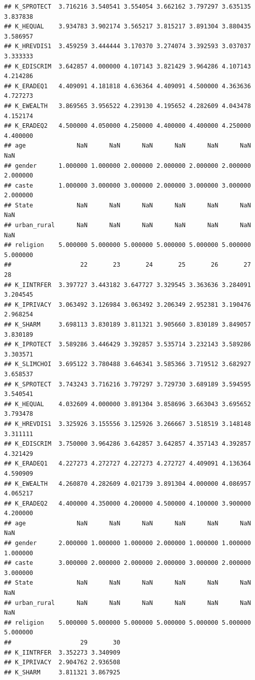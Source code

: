 \documentclass[
]{article}
\begin{document}
\begin{verbatim}
## K_SPROTECT  3.716216 3.540541 3.554054 3.662162 3.797297 3.635135 3.837838
## K_HEQUAL    3.934783 3.902174 3.565217 3.815217 3.891304 3.880435 3.586957
## K_HREVDIS1  3.459259 3.444444 3.170370 3.274074 3.392593 3.037037 3.333333
## K_EDISCRIM  3.642857 4.000000 4.107143 3.821429 3.964286 4.107143 4.214286
## K_ERADEQ1   4.409091 4.181818 4.636364 4.409091 4.500000 4.363636 4.727273
## K_EWEALTH   3.869565 3.956522 4.239130 4.195652 4.282609 4.043478 4.152174
## K_ERADEQ2   4.500000 4.050000 4.250000 4.400000 4.400000 4.250000 4.400000
## age              NaN      NaN      NaN      NaN      NaN      NaN      NaN
## gender      1.000000 1.000000 2.000000 2.000000 2.000000 2.000000 2.000000
## caste       1.000000 3.000000 3.000000 2.000000 3.000000 3.000000 2.000000
## State            NaN      NaN      NaN      NaN      NaN      NaN      NaN
## urban_rural      NaN      NaN      NaN      NaN      NaN      NaN      NaN
## religion    5.000000 5.000000 5.000000 5.000000 5.000000 5.000000 5.000000
##                   22       23       24       25       26       27       28
## K_IINTRFER  3.397727 3.443182 3.647727 3.329545 3.363636 3.284091 3.204545
## K_IPRIVACY  3.063492 3.126984 3.063492 3.206349 2.952381 3.190476 2.968254
## K_SHARM     3.698113 3.830189 3.811321 3.905660 3.830189 3.849057 3.830189
## K_IPROTECT  3.589286 3.446429 3.392857 3.535714 3.232143 3.589286 3.303571
## K_SLIMCHOI  3.695122 3.780488 3.646341 3.585366 3.719512 3.682927 3.658537
## K_SPROTECT  3.743243 3.716216 3.797297 3.729730 3.689189 3.594595 3.540541
## K_HEQUAL    4.032609 4.000000 3.891304 3.858696 3.663043 3.695652 3.793478
## K_HREVDIS1  3.325926 3.155556 3.125926 3.266667 3.518519 3.148148 3.311111
## K_EDISCRIM  3.750000 3.964286 3.642857 3.642857 4.357143 4.392857 4.321429
## K_ERADEQ1   4.227273 4.272727 4.227273 4.272727 4.409091 4.136364 4.590909
## K_EWEALTH   4.260870 4.282609 4.021739 3.891304 4.000000 4.086957 4.065217
## K_ERADEQ2   4.400000 4.350000 4.200000 4.500000 4.100000 3.900000 4.200000
## age              NaN      NaN      NaN      NaN      NaN      NaN      NaN
## gender      2.000000 1.000000 1.000000 2.000000 1.000000 1.000000 1.000000
## caste       3.000000 2.000000 2.000000 2.000000 3.000000 2.000000 3.000000
## State            NaN      NaN      NaN      NaN      NaN      NaN      NaN
## urban_rural      NaN      NaN      NaN      NaN      NaN      NaN      NaN
## religion    5.000000 5.000000 5.000000 5.000000 5.000000 5.000000 5.000000
##                   29       30
## K_IINTRFER  3.352273 3.340909
## K_IPRIVACY  2.904762 2.936508
## K_SHARM     3.811321 3.867925

\end{verbatim}
\end{document}
